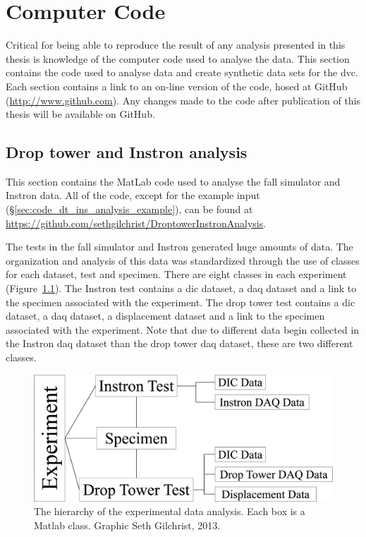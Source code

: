 \chapter{Computer Code}
\label{ch:code}
Critical for being able to reproduce the result of any analysis presented in this thesis is knowledge of the computer code used to analyse the data.
This section contains the code used to analyse data and create synthetic data sets for the \ac{dvc}.
Each section contains a link to an on-line version of the code, hosed at GitHub (\url{http://www.github.com}).
Any changes made to the code after publication of this thesis will be available on GitHub.

\section{Drop tower and Instron analysis}
\label{sec:code_dt_ins_analysis}
This section contains the MatLab code used to analyse the fall simulator and Instron data.
All of the code, except for the example input (\S\ref{sec:code_dt_ins_analysis_example}), can be found at \url{https://github.com/sethgilchrist/DroptowerInstronAnalysis}.

The tests in the fall simulator and Instron generated huge amounts of data.
The organization and analysis of this data was standardized through the use of classes for each dataset, test and specimen.
There are eight classes in each experiment (Figure~\ref{fig:AnalysisHigherarchy}).
The Instron test contains a \ac{dic} dataset, a \ac{daq} dataset and a link to the specimen associated with the experiment.
The drop tower test contains a \ac{dic} dataset, a \ac{daq} dataset, a displacement dataset and a link to the specimen associated with the experiment.
Note that due to different data begin collected in the Instron \ac{daq} dataset than the drop tower \ac{daq} dataset, these are two different classes.

\begin{figure}
\centering
\includegraphics[width=\linewidth]{./appendixCode/analysisCode/Figures/AnalysisHigherarchy}
\caption[Data analysis hierarchy]{The hierarchy of the experimental data analysis. Each box is a Matlab class. Graphic \textcopyright Seth Gilchrist, 2013.}
\label{fig:AnalysisHigherarchy}
\end{figure}

